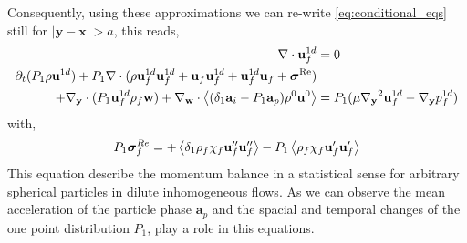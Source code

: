 Consequently, using these approximations we can re-write \ref{eq:conditional_eqs} still for $|\textbf{y}-\textbf{x}| > a$, this reads,  
\begin{align}
    \div \textbf{u}^{1d}_f &= 0 \\
    \pddt (P_1 \rho \textbf{u}^{1d})
    + P_1 \div (
    \rho \textbf{u}^{1d}_f\textbf{u}^{1d}_f 
    + \textbf{u}_f\textbf{u}^{1d}_f
    + \textbf{u}^{1d}_f\textbf{u}_f
    + \bm\sigma^\text{Re})\nonumber\\
    + \pddy\cdot (P_1 \textbf{u}^{1d}_f\rho_f\textbf{w}) 
    + \pddw\cdot \avg{(\delta_1 \textbf{a}_i- P_1 \textbf{a}_p)\rho^0\textbf{u}^0 }
    &= P_1 (
        \mu \pddy^2 \textbf{u}^{1d}_f  
        - \pddy p^{1d}_f 
    )
    \label{eq:NS_dilute_inertiel}
\end{align}
with, 
\begin{equation*}
    P_1\bm\sigma^{Re}_f
    = 
    + \left<\delta_1\rho_f\chi_f\textbf{u}_f''\textbf{u}_f''\right>
    - P_1 \left<\rho_f\chi_f\textbf{u}_f'\textbf{u}_f'\right>
\end{equation*}
This equation describe the momentum balance in a statistical sense for arbitrary spherical particles in dilute inhomogeneous flows. 
As we can observe the mean acceleration of the particle phase $\textbf{a}_p$ and the spacial and temporal changes of the one point distribution $P_1$, play a role in this equations. 

